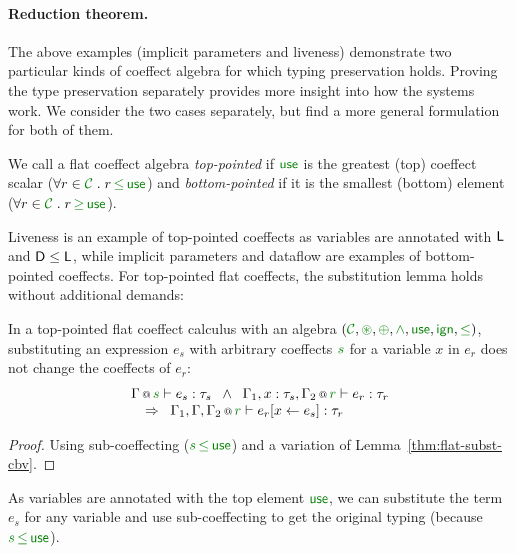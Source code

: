 \paragraph{Reduction theorem.}
The above examples (implicit parameters and liveness) demonstrate two particular kinds of coeffect
algebra for which typing preservation holds. Proving the type preservation separately provides
more insight into how the systems work. We consider the two cases separately, but find a more general
formulation for both of them.

\begin{definition}
We call a flat coeffect algebra \emph{top-pointed} if $\cunit$ is the greatest (top) coeffect scalar
($\forall r \in \C \;.\; r \,\cleq\, \cunit $) and \emph{bottom-pointed} if it is the smallest (bottom)
element ($\forall r \in \C \;.\; r \,\cgeq\, \cunit $).
\end{definition}

\noindent
Liveness is an example of top-pointed coeffects as variables are annotated with
$\textnormal{\sffamily L}$ and $\textnormal{\sffamily D} \leq \textnormal{\sffamily L}$, while implicit parameters and dataflow are examples
of bottom-pointed coeffects. For top-pointed flat coeffects, the substitution lemma holds without
additional demands:

\begin{lemma}
\label{thm:cbn-substitution-top}
In a top-pointed flat coeffect calculus with an algebra $(\C, \cseq, \cpar, \czip, \cunit, \czero, \cleq)$,
substituting an expression $e_s$ with arbitrary coeffects $\cclrd{s}$ for a variable $x$ in $e_r$ does
not change the coeffects of $e_r$:
%
\begin{equation*}
\begin{array}{l}
 \coctx{\Gamma}{\cclrd{s}} \vdash e_s : \tau_s \;\; \wedge \;\;
   \coctx{\Gamma_1,  x : \tau_s, \Gamma_2}{ \cclrd{r}  } \vdash e_r : \tau_r\\
 \quad \Rightarrow \;\; \coctx{\Gamma_1,\Gamma,\Gamma_2}{ \cclrd{r} } \vdash \subst{e_r}{x}{e_s} : \tau_r
\end{array}
\end{equation*}
\end{lemma}

\begin{proof}
Using sub-coeffecting ($\cclrd{s} \,\cleq\, \cunit$) and a variation of Lemma~\ref{thm:flat-subst-cbv}.
\end{proof}
%
\noindent
As variables are annotated with the top element $\cunit$, we can substitute the term $e_s$
for any variable and use sub-coeffecting to get the original typing (because
$\cclrd{s} \,\cleq\, \cunit$).

